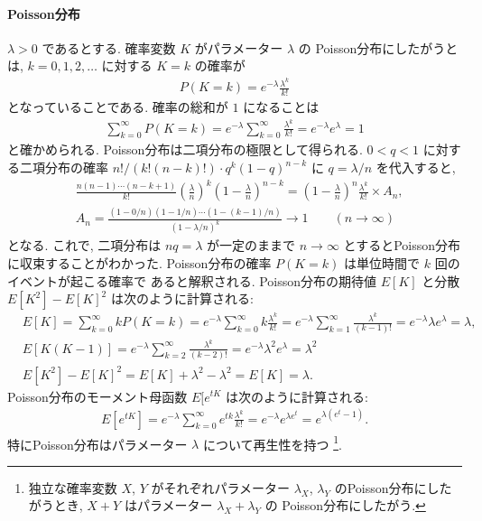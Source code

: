 \documentclass[12pt,twoside]{jarticle}
\theoremstyle{jplain}
\theoremstyle{jplain}
\theoremstyle{jplain}
\numberwithin{theorem}{section}
\numberwithin{equation}{section}
\numberwithin{figure}{section}
\numberwithin{table}{section}
\begin{document}
\paragraph{Poisson分布}
$\lambda>0$ であるとする. 確率変数 $K$ がパラメーター $\lambda$ の
Poisson分布にしたがうとは, $k=0,1,2,\ldots$ に対する $K=k$ の確率が
\begin{align*}
P(K=k)=e^{-\lambda}\frac{\lambda^k}{k!}
\end{align*}
となっていることである. 確率の総和が $1$ になることは
\begin{align*}
\sum_{k=0}^\infty P(K=k)
=e^{-\lambda}\sum_{k=0}^\infty\frac{\lambda^k}{k!}
=e^{-\lambda}e^\lambda
=1
\end{align*}
と確かめられる. Poisson分布は二項分布の極限として得られる.
$0<q<1$ に対する二項分布の確率 $n!/(k!(n-k)!)\cdot q^k(1-q)^{n-k}$ 
に $q=\lambda/n$ を代入すると, 
\begin{align*}
&
\frac{n(n-1)\cdots(n-k+1)}{k!}
\left(\frac{\lambda}{n}\right)^k\left(1-\frac{\lambda}{n}\right)^{n-k}
=\left(1-\frac{\lambda}{n}\right)^n\frac{\lambda^k}{k!}
\times A_n,
\\ &
A_n
=\frac{(1-0/n)(1-1/n)\cdots(1-(k-1)/n)}{(1-\lambda/n)^k}
\to 1 \qquad (n\to\infty)
\end{align*}
となる. これで, 二項分布は $nq=\lambda$ が一定のままで $n\to\infty$
とするとPoisson分布に収束することがわかった.
Poisson分布の確率 $P(K=k)$ は単位時間で $k$ 回のイベントが起こる確率で
あると解釈される. 
Poisson分布の期待値 $E[K]$ と分散 $E[K^2]-E[K]^2$ は次のように計算される:
\begin{align*}
&
E[K] = \sum_{k=0}^\infty k P(K=k)
= e^{-\lambda}\sum_{k=0}^\infty k \frac{\lambda^k}{k!}
= e^{-\lambda}\sum_{k=1}^\infty \frac{\lambda^k}{(k-1)!}
= e^{-\lambda}\lambda e^\lambda
= \lambda,
\\ &
E[K(K-1)] = e^{-\lambda}\sum_{k=2}^\infty \frac{\lambda^k}{(k-2)!}
=e^{-\lambda}\lambda^2 e^\lambda
=\lambda^2
\\ &
E[K^2]-E[K]^2 = E[K]+\lambda^2-\lambda^2 = E[K] = \lambda.
\end{align*}
Poisson分布のモーメント母函数 $E[e^{tK}$ は次のように計算される:
\begin{align*}
E[e^{tK}]
= e^{-\lambda}\sum_{k=0}^\infty e^{tk}\frac{\lambda^k}{k!}
= e^{-\lambda}e^{\lambda e^t}
= e^{\lambda(e^t-1)}.
\end{align*}
特にPoisson分布はパラメーター $\lambda$ について再生性を持つ%
\footnote{独立な確率変数 $X$, $Y$ がそれぞれパラメーター $\lambda_X$, $\lambda_Y$
のPoisson分布にしたがうとき, $X+Y$ はパラメーター $\lambda_X+\lambda_Y$ の
Poisson分布にしたがう.}.
\end{document}
